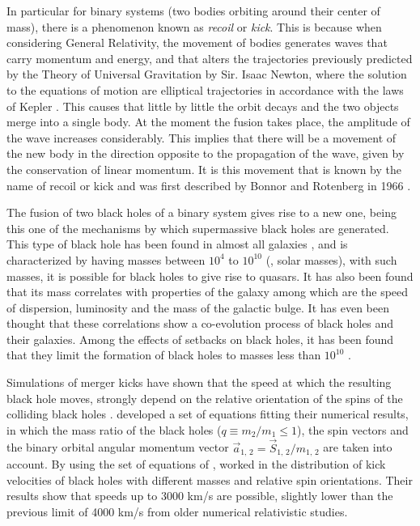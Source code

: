 	In particular for binary systems (two bodies orbiting around their center of mass), there is a phenomenon known as \textit{recoil} or \textit{kick}. This is because when considering General Relativity, the movement of bodies generates waves that carry momentum and energy, and that alters the trajectories previously predicted by the Theory of Universal Gravitation by Sir. Isaac Newton, where the solution to the equations of motion are elliptical trajectories in accordance with the laws of Kepler \cite{hughes2005black, hoyng2006gravitational, brugmann2018fundamentals}. This causes that little by little the orbit decays and the two objects merge into a single body. At the moment the fusion takes place, the amplitude of the wave increases considerably. This implies that there will be a movement of the new body in the direction opposite to the propagation of the wave, given by the conservation of linear momentum. It is this movement that is known by the name of recoil or kick and was first described by Bonnor and Rotenberg in 1966 \cite{hughes2005black, bonnor1966gravitational}.
	
	The fusion of two black holes of a binary system gives rise to a new one, being this one of the mechanisms by which supermassive black holes are generated. This type of black hole has been found in almost all galaxies \cite{choksi2017recoiling}, and is characterized by having masses between $10^4$ \sm to $10^{10}$ \sm (\sm, solar masses), with such masses, it is possible for black holes to give rise to quasars. It has also been found that its mass correlates with properties of the galaxy among which are the speed of dispersion, luminosity and the mass of the galactic bulge. It has even been thought that these correlations show a co-evolution process of black holes and their galaxies. Among the effects of setbacks on black holes, it has been found that they limit the formation of black holes to masses less than $10^{10}$ \sm \cite{choksi2017recoiling}.
	
	Simulations of merger kicks have shown that the speed at which the resulting black hole moves, strongly depend on the relative orientation of the spins of the colliding black holes \cite{baker2008modeling}. \citeauthor{baker2008modeling} developed a set of equations fitting their numerical results, in which the mass ratio of the black holes ($q \equiv m_2 / m_1 \leq 1$), the spin vectors and the binary orbital angular momentum vector $\vec{a}_\text{1, 2} = \vec{S}_\text{1, 2}/m_\text{1, 2}$ are taken into account. By using the set of equations of \citeauthor{baker2008modeling}, \citeauthor{tanaka2009assembly} worked in the distribution of kick velocities of black holes with different masses and relative spin orientations. Their results show that speeds up to 3000 km/s are possible, slightly lower than the previous limit of 4000 km/s from older numerical relativistic studies.
	
